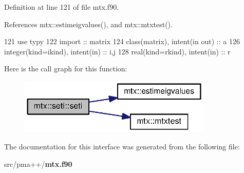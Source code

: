 Definition at line 121 of file mtx.\+f90.



References mtx\+::estimeigvalues(), and mtx\+::mtxtest().


\begin{DoxyCode}
121             \textcolor{keywordtype}{use }typy
122             \textcolor{keywordtype}{import }:: matrix
124             \textcolor{keywordtype}{class}(matrix), \textcolor{keywordtype}{intent(in out)} :: a
126             \textcolor{keywordtype}{integer(kind=ikind)}, \textcolor{keywordtype}{intent(in)} :: i,j
128             \textcolor{keywordtype}{real(kind=rkind)}, \textcolor{keywordtype}{intent(in)} :: r
\end{DoxyCode}


Here is the call graph for this function\+:\nopagebreak
\begin{figure}[H]
\begin{center}
\leavevmode
\includegraphics[width=261pt]{interfacemtx_1_1seti_a9fdf84fcf3ea0273201d44bf9e713480_cgraph}
\end{center}
\end{figure}




The documentation for this interface was generated from the following file\+:\begin{DoxyCompactItemize}
\item 
src/pma++/{\bf mtx.\+f90}\end{DoxyCompactItemize}
